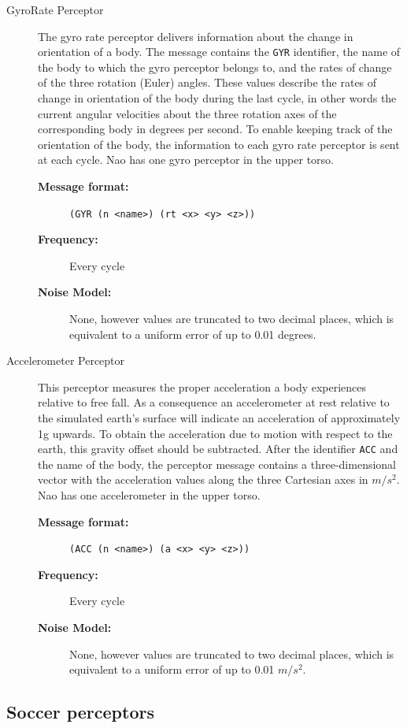 \begin{description}
  \item [GyroRate Perceptor]
  The gyro rate perceptor delivers information about the change in orientation of a body. The message contains the \texttt{GYR} identifier, the name of the body to which the gyro perceptor belongs to, and the rates of change of the three rotation (Euler) angles. These values describe the rates of change in orientation of the body during the last cycle, in other words the current angular velocities about the three rotation axes of the corresponding body in degrees per second. To enable keeping track of the orientation of the body, the information to each gyro rate perceptor is sent at each cycle. Nao has one gyro perceptor in the upper torso.
  \begin{description}
  \item[{\bf Message format:}]
  \texttt{(GYR (n <name>) (rt <x> <y> <z>))}
  \item[{\bf Frequency:}]
  Every cycle
  \item[{\bf Noise Model:}]None, however values are truncated to two decimal places, which is equivalent to a uniform error of up to 0.01 degrees.
  \end{description}

  \item [Accelerometer Perceptor]
  This perceptor measures the proper acceleration a body experiences relative to free fall. As a consequence an accelerometer at rest relative to the simulated earth's surface will indicate an acceleration of approximately 1g upwards. To obtain the acceleration due to motion with respect to the earth, this gravity offset should be subtracted. After the identifier \texttt{ACC} and the name of the body, the perceptor message contains a three-dimensional vector with the acceleration values along the three Cartesian axes in $m/s^2$. Nao has one accelerometer in the upper torso.
    \begin{description}
  \item[{\bf Message format:}]
  \texttt{(ACC (n <name>) (a <x> <y> <z>))}
  \item[{\bf Frequency:}]
  Every cycle
  \item[{\bf Noise Model:}]None, however values are truncated to two decimal places, which is equivalent to a uniform error of up to 0.01 $m/s^{2}$.
  \end{description}
\end{description}

\subsection{Soccer perceptors}

